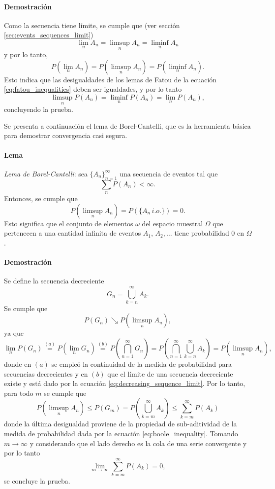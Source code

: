 \documentclass[a4paper]{report}
\begin{document}
\paragraph{Demostración} Como la secuencia tiene límite, se cumple que (ver sección \ref{sec:events_sequences_limit})
\[
 \lim_n A_n=\limsup_n A_n=\liminf_n A_n
\]
y por lo tanto, 
\[
 P\left(\lim_n A_n\right)=P\left(\limsup_n A_n\right)=P\left(\liminf_n A_n\right).
\]
Esto indica que las desigualdades de los lemas de Fatou de la ecuación \ref{eq:fatou_inequalities} deben ser igualdades, y por lo tanto
\[
 \limsup_n P(A_n)=\liminf_n P(A_n)=\lim_n P(A_n),
\]
concluyendo la prueba.

Se presenta a continuación el lema de Borel-Cantelli, que es la herramienta básica para demostrar convergencia casi segura.

\paragraph{Lema} \emph{Lema de Borel-Cantelli}: sea \(\{A_n\}_{n=1}^{\infty}\) una secuencia  de eventos tal que
\[
 \sum_n P(A_n)<\infty.
\]
Entonces, se cumple que
\[
  P\left(\limsup_n A_n\right) = P(\{A_n\,i.o.\})=0.
\]
Esto significa que el conjunto de elementos \(\omega\) del espacio muestral \(\Omega\) que pertenecen a una cantidad infinita de eventos \(A_1,\,A_2,\dots\) tiene probabilidad 0 en \(\Omega\).

\paragraph{Demostración} Se define la secuencia decreciente
\[
 G_n=\bigcup_{k=n}^\infty A_k.
\]
Se cumple que
\[
 P(G_n)\searrow P\left(\limsup_n A_n\right),
\]
ya que
\[
 \lim_n P(G_n)\overset{(a)}{=}P\left(\lim_n G_n\right)
 \overset{(b)}{=}P\left(\bigcap_{n=1}^\infty G_n\right)
 =P\left(\bigcap_{n=1}^\infty \bigcup_{k=n}^\infty A_k\right)
 =P\left(\limsup_n A_n\right),
\]
donde en \((a)\) se empleó la continuidad de la medida de probabilidad para secuencias decrecientes y en \((b)\) que el límite de una secuencia decreciente existe y está dado por la ecuación \ref{eq:decreasing_sequence_limit}. Por lo tanto, para todo \(m\) se cumple que
\[
 P\left(\limsup_n A_n\right)\leq P(G_m)=P\left(\bigcup_{k=m}^\infty A_k\right)\leq\sum_{k=m}^\infty P(A_k)
\]
donde la última desigualdad proviene de la propiedad de sub-aditividad de la medida de probabilidad dada por la ecuación \ref{eq:boole_inequality}. Tomando \(m\to\infty\) y considerando que el lado derecho es la cola de una serie convergente y por lo tanto
\[
 \lim_{m\to\infty}\sum_{k=m}^\infty P(A_k)=0,
\]
se concluye la prueba.
\end{document}
